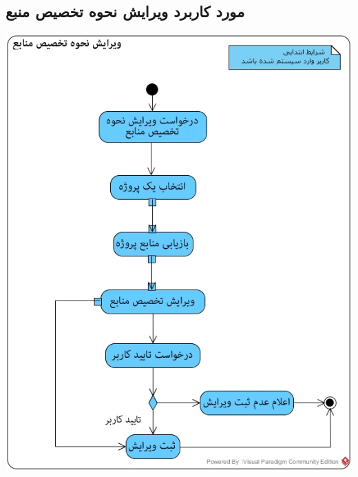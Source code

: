 \documentclass{article}
\begin{document}
\subsection*{مورد کاربرد ویرایش نحوه تخصیص منبع}
\vspace{2cm}
\begin{center}
\includegraphics[width=\textwidth]{ActivityDiagrams/37.jpg}
\end{center}

\newpage
\vspace{2cm}
\end{document}
